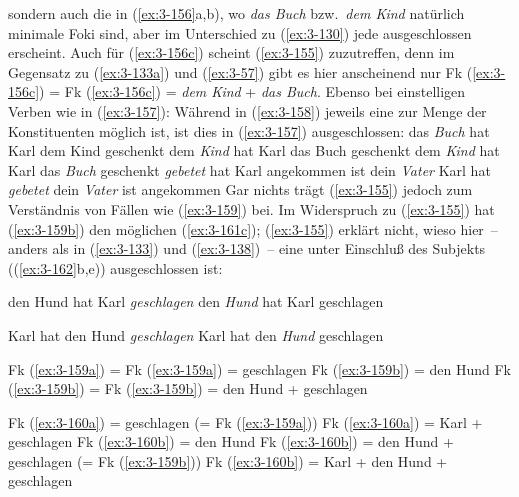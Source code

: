\documentclass[output=paper]{langsci/langscibook}
\begin{document}
sondern auch die in (\ref{ex:3-156}a,b), wo \textit{das Buch} bzw.\ \textit{dem Kind} natürlich minimale Foki sind, aber im Unterschied zu (\ref{ex:3-130}) jede  ausgeschlossen erscheint. Auch für (\ref{ex:3-156c}) scheint (\ref{ex:3-155}) zuzutreffen, denn im Gegensatz zu (\ref{ex:3-133a}) und (\ref{ex:3-57}) gibt es hier anscheinend nur Fk (\ref{ex:3-156c}) = Fk (\ref{ex:3-156c}) = \textit{dem Kind} + \textit{das Buch}. Ebenso
bei einstelligen Verben wie in (\ref{ex:3-157}): Während in (\ref{ex:3-158}) jeweils eine
 zur Menge der Konstituenten möglich ist, ist dies in
(\ref{ex:3-157}) ausgeschlossen:
\eal
\label{ex:3-156}
\ex
\label{ex:3-156a}
das \textit{Buch} hat Karl dem Kind geschenkt
\ex
\label{ex:3-156b}
dem \textit{Kind} hat Karl das Buch geschenkt
\ex
\label{ex:3-156c}
dem \textit{Kind} hat Karl das \textit{Buch} geschenkt
\zl
\eal
\label{ex:3-157}
\ex
\label{ex:3-157a}
\textit{gebetet} hat Karl
\ex
\label{ex:3-157b}
angekommen ist dein \textit{Vater}
\zl
\eal
\label{ex:3-158}
\ex
\label{ex:3-158a}
Karl hat \textit{gebetet}
\ex
\label{ex:3-158b}
dein \textit{Vater} ist angekommen
\zl
Gar nichts trägt (\ref{ex:3-155}) jedoch zum Verständnis von Fällen wie (\ref{ex:3-159})
bei. Im Widerspruch zu (\ref{ex:3-155}) hat (\ref{ex:3-159b}) den möglichen  (\ref{ex:3-161c});
(\ref{ex:3-155}) erklärt nicht, wieso hier~-- anders als in (\ref{ex:3-133}) und (\ref{ex:3-138})~--
eine  unter Einschluß des Subjekts ((\ref{ex:3-162}b,e))
ausgeschlossen ist:
\begin{exe}
\ex
\label{ex:3-159}
\begin{xlist}
\ex
\label{ex:3-159a}
den Hund hat Karl \textit{geschlagen}
\ex
\label{ex:3-159b}
den \textit{Hund} hat Karl geschlagen
\end{xlist}
\ex
\label{ex:3-160}
\begin{xlist}
\ex
\label{ex:3-160a}
Karl hat den Hund \textit{geschlagen}
\ex
\label{ex:3-160b}
Karl hat den \textit{Hund} geschlagen
\end{xlist}
\ex
\label{ex:3-161}
\begin{xlist}
\ex
\label{ex:3-161a}
Fk (\ref{ex:3-159a}) = Fk (\ref{ex:3-159a}) = geschlagen
\ex
\label{ex:3-161b}
Fk (\ref{ex:3-159b}) = den Hund
\ex
\label{ex:3-161c}
Fk (\ref{ex:3-159b}) = Fk (\ref{ex:3-159b}) = den Hund + geschlagen
\end{xlist}
\ex
\label{ex:3-162}
\begin{xlist}
\ex
\label{ex:3-162a}
Fk (\ref{ex:3-160a}) = geschlagen (= Fk  (\ref{ex:3-159a}))
\ex
\label{ex:3-162b}
Fk (\ref{ex:3-160a}) = Karl + geschlagen
\ex
\label{ex:3-162c}
Fk (\ref{ex:3-160b}) = den Hund
\ex
\label{ex:3-162d}
Fk (\ref{ex:3-160b}) = den Hund + geschlagen (= Fk (\ref{ex:3-159b}))
\ex
\label{ex:3-162e}
Fk (\ref{ex:3-160b}) = Karl + den Hund + geschlagen
\end{xlist}
\end{exe}
\end{document}
